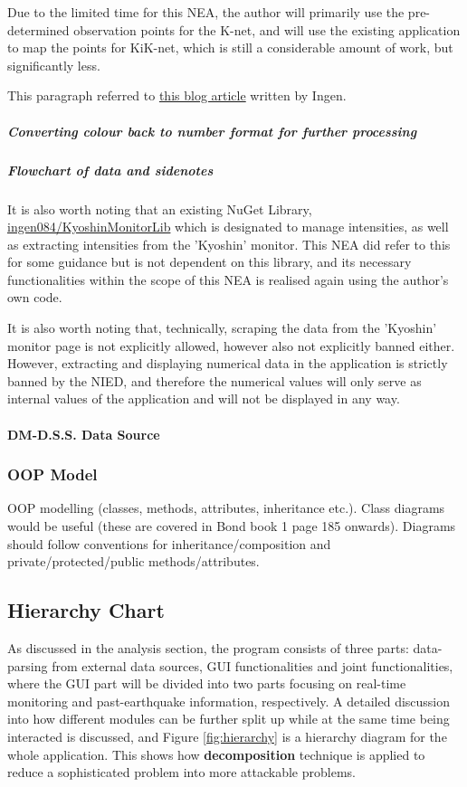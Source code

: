 \documentclass[10pt]{article}
\newcommand{\GitHubHref}[2]{\href{https://github.com/#1/#2}{\faGithub\space #1/#2}}
\begin{document}
Due to the limited time for this NEA, the author will primarily use the pre-determined observation points for the K-net, and will use the existing application to map the points for KiK-net, which is still a considerable amount of work, but significantly less.

This paragraph referred to \href{https://qiita.com/ingen084/items/7e91f8da2996972ac586}{this blog article} written by Ingen.


\subparagraph{Converting colour back to number format for further processing}

\subparagraph{Flowchart of data and sidenotes}

It is also worth noting that an existing NuGet Library, \GitHubHref{ingen084}{KyoshinMonitorLib} which is designated to manage intensities, as well as extracting intensities from the 'Kyoshin' monitor. This NEA did refer to this for some guidance but is not dependent on this library, and its necessary functionalities within the scope of this NEA is realised again using the author's own code.

It is also worth noting that, technically, scraping the data from the 'Kyoshin' monitor page is not explicitly allowed, however also not explicitly banned either. However, extracting and displaying numerical data in the application is strictly banned by the NIED, and therefore the numerical values will only serve as internal values of the application and will not be displayed in any way.

\paragraph{DM-D.S.S. Data Source}

\subsubsection{OOP Model}
OOP modelling (classes, methods, attributes, inheritance etc.). Class diagrams would be useful (these are covered in Bond book 1 page 185 onwards). Diagrams should follow conventions for inheritance/composition and private/protected/public methods/attributes.

\subsection{Hierarchy Chart}
As discussed in the analysis section, the program consists of three parts: data-parsing from external data sources, GUI functionalities and joint functionalities, where the GUI part will be divided into two parts focusing on real-time monitoring and past-earthquake information, respectively. A detailed discussion into how different modules can be further split up while at the same time being interacted is discussed, and Figure \ref{fig:hierarchy} is a hierarchy diagram for the whole application. This shows how \textbf{decomposition} technique is applied to reduce a sophisticated problem into more attackable problems.
\end{document}
